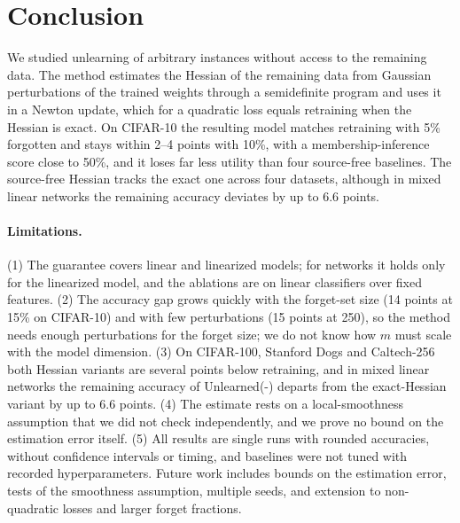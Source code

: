 \documentclass[10pt,twocolumn,letterpaper]{article}
\begin{document}
\section{Conclusion}
\label{sec:conclusion}
We studied unlearning of arbitrary instances without access to the remaining data.
The method estimates the Hessian of the remaining data from Gaussian perturbations of the trained weights through a semidefinite program and uses it in a Newton update, which for a quadratic loss equals retraining when the Hessian is exact.
On CIFAR-10 the resulting model matches retraining with 5\% forgotten and stays within 2--4 points with 10\%, with a membership-inference score close to 50\%, and it loses far less utility than four source-free baselines.
The source-free Hessian tracks the exact one across four datasets, although in mixed linear networks the remaining accuracy deviates by up to 6.6 points.

\paragraph{Limitations.}
(1) The guarantee covers linear and linearized models; for networks it holds only for the linearized model, and the ablations are on linear classifiers over fixed features.
(2) The accuracy gap grows quickly with the forget-set size (14 points at 15\% on CIFAR-10) and with few perturbations (15 points at 250), so the method needs enough perturbations for the forget size; we do not know how $m$ must scale with the model dimension.
(3) On CIFAR-100, Stanford Dogs and Caltech-256 both Hessian variants are several points below retraining, and in mixed linear networks the remaining accuracy of Unlearned(-) departs from the exact-Hessian variant by up to 6.6 points.
(4) The estimate rests on a local-smoothness assumption that we did not check independently, and we prove no bound on the estimation error itself.
(5) All results are single runs with rounded accuracies, without confidence intervals or timing, and baselines were not tuned with recorded hyperparameters.
Future work includes bounds on the estimation error, tests of the smoothness assumption, multiple seeds, and extension to non-quadratic losses and larger forget fractions.

{
    \small
    
    
}

\end{document}
